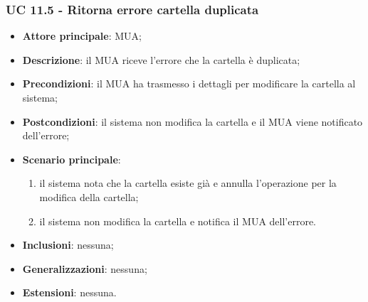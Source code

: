 \subsubsection{UC 11.5 - Ritorna errore cartella duplicata} \label{sec:UC11.5}
\begin{itemize}
    \item \textbf{Attore principale}: MUA;
    \item \textbf{Descrizione}: il MUA riceve l'errore che la cartella è duplicata;
    \item \textbf{Precondizioni}: il MUA ha trasmesso i dettagli per modificare la cartella al sistema;
    \item \textbf{Postcondizioni}: il sistema non modifica la cartella e il MUA viene notificato dell'errore;
    \item \textbf{Scenario principale}:
        \begin{enumerate}
            \item il sistema nota che la cartella esiste già e annulla l'operazione per la modifica della cartella;
            \item il sistema non modifica la cartella e notifica il MUA dell'errore.
        \end{enumerate}
    \item \textbf{Inclusioni}: nessuna;
    \item \textbf{Generalizzazioni}: nessuna;
    \item \textbf{Estensioni}: nessuna.
\end{itemize}

